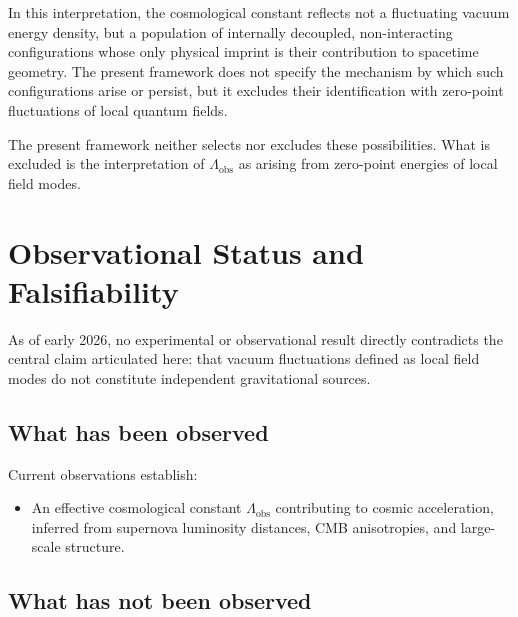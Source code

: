 \documentclass[12pt,letterpaper]{article}
\begin{document}
In this interpretation, the cosmological constant reflects not a fluctuating vacuum energy density, but a population of internally decoupled, non-interacting configurations whose only physical imprint is their contribution to spacetime geometry. The present framework does not specify the mechanism by which such configurations arise or persist, but it excludes their identification with zero-point fluctuations of local quantum fields.

\vspace{0.5cm}

The present framework neither selects nor excludes these possibilities. What is excluded is the interpretation of $\Lambda_{\mathrm{obs}}$ as arising from zero-point energies of local field modes.


\section{Observational Status and Falsifiability}

As of early 2026, no experimental or observational result directly contradicts the central claim articulated here: that vacuum fluctuations defined as local field modes do not constitute independent gravitational sources.

\subsection{What has been observed}

Current observations establish:
\begin{itemize}
\item An effective cosmological constant $\Lambda_{\mathrm{obs}}$ contributing to cosmic acceleration, inferred from supernova luminosity distances, CMB anisotropies, and large-scale structure.
\end{itemize}

\subsection{What has not been observed}
\end{document}
